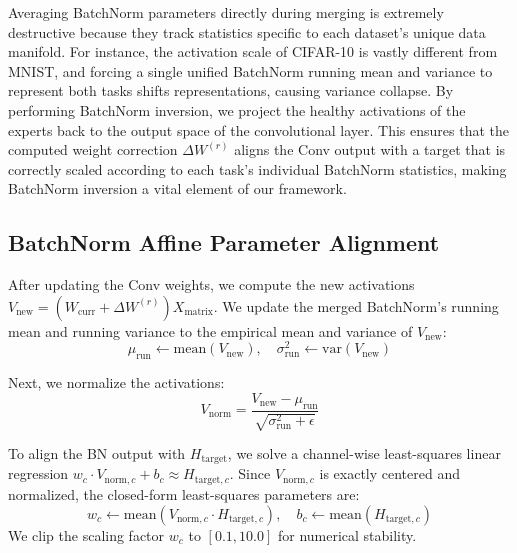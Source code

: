 \documentclass{article}
\theoremstyle{plain}
\theoremstyle{definition}
\theoremstyle{remark}
\begin{document}
Averaging BatchNorm parameters directly during merging is extremely destructive because they track statistics specific to each dataset's unique data manifold. For instance, the activation scale of CIFAR-10 is vastly different from MNIST, and forcing a single unified BatchNorm running mean and variance to represent both tasks shifts representations, causing variance collapse. By performing BatchNorm inversion, we project the healthy activations of the experts back to the output space of the convolutional layer. This ensures that the computed weight correction $\Delta W^{(r)}$ aligns the Conv output with a target that is correctly scaled according to each task's individual BatchNorm statistics, making BatchNorm inversion a vital element of our framework.

\subsection{BatchNorm Affine Parameter Alignment}
After updating the Conv weights, we compute the new activations $V_{\text{new}} = (W_{\text{curr}} + \Delta W^{(r)}) X_{\text{matrix}}$. We update the merged BatchNorm's running mean and running variance to the empirical mean and variance of $V_{\text{new}}$:
\begin{equation}
  \mu_{\text{run}} \leftarrow \text{mean}(V_{\text{new}}), \quad \sigma_{\text{run}}^2 \leftarrow \text{var}(V_{\text{new}})
\end{equation}

Next, we normalize the activations:
\begin{equation}
  V_{\text{norm}} = \frac{V_{\text{new}} - \mu_{\text{run}}}{\sqrt{\sigma_{\text{run}}^2 + \epsilon}}
\end{equation}

To align the BN output with $H_{\text{target}}$, we solve a channel-wise least-squares linear regression $w_c \cdot V_{\text{norm}, c} + b_c \approx H_{\text{target}, c}$. Since $V_{\text{norm}, c}$ is exactly centered and normalized, the closed-form least-squares parameters are:
\begin{equation}
  w_c \leftarrow \text{mean}(V_{\text{norm}, c} \cdot H_{\text{target}, c}), \quad b_c \leftarrow \text{mean}(H_{\text{target}, c})
\end{equation}
We clip the scaling factor $w_c$ to $[0.1, 10.0]$ for numerical stability.
\end{document}
